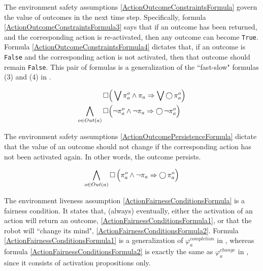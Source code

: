 The environment safety assumptions \eqref{ActionOutcomeConstraintsFormula} govern the value of outcomes in the next time step. 
Specifically, formula \eqref{ActionOutcomeConstraintsFormula3} says that if an outcome has been returned, and the corresponding action is re-activated, then any outcome can become \texttt{True}. 
Formula \eqref{ActionOutcomeConstraintsFormula4} dictates that, if an outcome is \texttt{False} and the corresponding action is not activated, then that outcome should remain \texttt{False}.
This pair of formulas is a generalization of the ``fast-slow" formulas (3) and (4) in \cite{Vasu2013ICRA}.

\begin{subequations}
	\label{ActionOutcomeConstraintsFormula}
	\begin{align}
		\operatorname{\Box}& \Big( \bigvee \pi_a^o \wedge \pi_a \Rightarrow \bigvee \operatorname{\bigcirc} \pi_a^o \Big)\label{ActionOutcomeConstraintsFormula3}\\
		\bigwedge \limits_{o \in Out(a)} \operatorname{\Box}& \Big( \lnot \pi_a^o \wedge \lnot \pi_a \Rightarrow \operatorname{\bigcirc} \lnot \pi_a^o \Big)\label{ActionOutcomeConstraintsFormula4}
	\end{align}
\end{subequations}

The environment safety assumptions \eqref{ActionOutcomePersistenceFormula} dictate that the value of an outcome should not change if the corresponding action has not been activated again. 
In other words, the outcome persists.

\begin{equation}\label{ActionOutcomePersistenceFormula}
	\bigwedge \limits_{o \in Out(a)} \operatorname{\Box} \Big( \pi_a^o \wedge \lnot \pi_a \Rightarrow \operatorname{\bigcirc} \pi_a^o \Big)
\end{equation}

The environment liveness assumption \eqref{ActionFairnessConditionsFormula} is a fairness condition.
It states that, (always) eventually, either the activation of an action will return an outcome, \eqref{ActionFairnessConditionsFormula1}, or that the robot will ``change its mind", \eqref{ActionFairnessConditionsFormula2}.
Formula \eqref{ActionFairnessConditionsFormula1} is a generalization of $\varphi_a^{completion}$ in \cite{Vasu2013ICRA}, whereas formula \eqref{ActionFairnessConditionsFormula2} is exactly the same as $\varphi_a^{change}$ in \cite{Vasu2013ICRA}, since it consists of activation propositions only.

